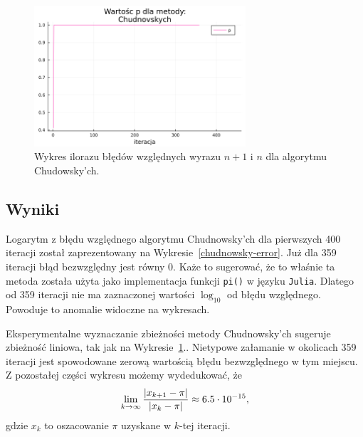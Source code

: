 \begin{figure}[!h]
    \centering
    \renewcommand{\figurename}{Wykres}
    \includegraphics[width=0.7\textwidth]{../prog/chudnowsky_error_ratio.png}
    \caption{Wykres ilorazu błędów względnych wyrazu $n+1$ i $n$ dla algorytmu Chudowsky'ch.}
    \label{chudnowsky-convergence}
\end{figure}

\subsection{Wyniki}

Logarytm z błędu względnego algorytmu Chudnowsky'ch dla pierwszych 400 iteracji został zaprezentowany na Wykresie~\ref{chudnowsky-error}. Już dla 359 iteracji błąd bezwzględny jest równy 0. Każe to sugerować, że to właśnie ta metoda została użyta jako implementacja funkcji \verb+pi()+ w języku \verb+Julia+. Dlatego od 359 iteracji nie ma zaznaczonej wartości $\log_{10}$ od błędu względnego. Powoduje to anomalie widoczne na wykresach.

Eksperymentalne wyznaczanie zbieżności metody Chudnowsky'ch sugeruje zbieżność liniowa, tak jak na Wykresie~\ref{chudnowsky-convergence}.. Nietypowe załamanie w okolicach 359 iteracji jest spowodowane zerową wartością błędu bezwzględnego w tym miejscu. Z pozostałej części wykresu możemy wydedukować, że
$$\lim_{k\to\infty}{{|x_{k+1}-\pi|\over |x_k-\pi|}}\approx 6.5\cdot 10^{-15},$$
gdzie $x_k$ to oszacowanie $\pi$ uzyskane w $k$-tej iteracji.
